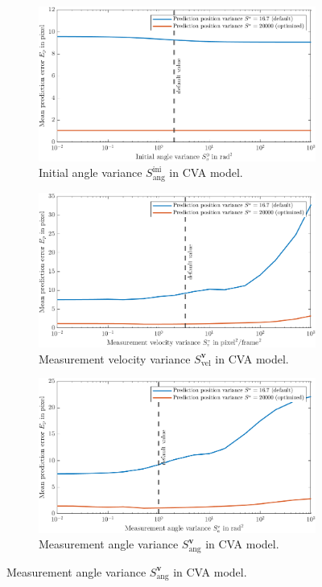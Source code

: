 \begin{figure}
    \ContinuedFloat
    \centering
	\begin{subfigure}[t]{0.8\textwidth}
		\includegraphics[width=\textwidth]{figures/KF/appendix/inia cva.png}
		\caption{Initial angle variance $S_{\mathrm{ang}}^{\mathrm{ini}}$ in CVA model.}
	\end{subfigure}
	\begin{subfigure}[t]{0.8\textwidth}
		\includegraphics[width=\textwidth]{figures/KF/appendix/meav cva.png}
		\caption{Measurement velocity variance $S_{\mathrm{vel}}^{\boldsymbol{v}}$ in CVA model.}
	\end{subfigure}
	\begin{subfigure}[t]{0.8\textwidth}
		\includegraphics[width=\textwidth]{figures/KF/appendix/meaa cva.png}
		\caption{Measurement angle variance $S_{\mathrm{ang}}^{\boldsymbol{v}}$ in CVA model.}
	\end{subfigure}
\end{figure}

